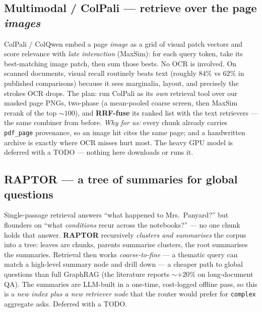 \documentclass[11pt]{article}
\newcommand{\code}[1]{\texttt{#1}}
\begin{document}
\subsection{Multimodal / ColPali --- retrieve over the page \emph{images}}
\label{sec:colpali}

ColPali / ColQwen embed a page \emph{image} as a grid of visual patch vectors and score relevance
with \emph{late interaction} (MaxSim): for each query token, take its best-matching image patch, then
sum those bests. No OCR is involved. On scanned documents, visual recall routinely beats text
(roughly $84\%$ vs $62\%$ in published comparisons) because it sees marginalia, layout, and precisely
the strokes OCR drops. The plan: run ColPali as its \emph{own} retrieval tool over our masked page
PNGs, two-phase (a mean-pooled coarse screen, then MaxSim rerank of the top $\sim 100$), and
\textbf{RRF-fuse} its ranked list with the text retrievers --- the same combiner from before.
\emph{Why for us:} every chunk already carries \code{pdf\_page} provenance, so an image hit cites the
same page; and a handwritten archive is exactly where OCR misses hurt most. The heavy GPU model is
deferred with a TODO --- nothing here downloads or runs it.

\subsection{RAPTOR --- a tree of summaries for global questions}

Single-passage retrieval answers ``what happened to Mrs.\ Panyard?'' but flounders on ``what
\emph{conditions} recur across the notebooks?'' --- no one chunk holds that answer. \textbf{RAPTOR}
recursively \emph{clusters and summarises} the corpus into a tree: leaves are chunks, parents
summarise clusters, the root summarises the summaries. Retrieval then works \emph{coarse-to-fine} ---
a thematic query can match a high-level summary node and drill down --- a cheaper path to global
questions than full GraphRAG (the literature reports $\sim +20\%$ on long-document QA). The summaries
are LLM-built in a one-time, cost-logged offline pass, so this is a \emph{new index plus a new
retriever node} that the router would prefer for \code{complex} aggregate asks. Deferred with a TODO.

\begin{center}
\end{center}
\end{document}
